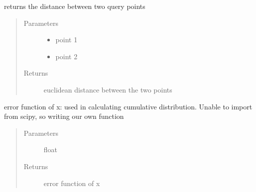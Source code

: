 \documentclass[letterpaper,12pt,english]{sphinxmanual}
\begin{document}
\begin{fulllineitems}
\label{\detokenize{PARyOpt:PARyOpt.utils.distance}}
\sphinxAtStartPar
returns the distance between two query points
\begin{quote}\begin{description}
\item[{Parameters}] \leavevmode\begin{itemize}
\item {} 
\sphinxAtStartPar
{} \textendash{} point 1

\item {} 
\sphinxAtStartPar
{} \textendash{} point 2

\end{itemize}

\item[{Returns}] \leavevmode
\sphinxAtStartPar
euclidean distance between the two points

\end{description}\end{quote}

\end{fulllineitems}


\begin{fulllineitems}
\label{\detokenize{PARyOpt:PARyOpt.utils.erf}}
\sphinxAtStartPar
error function of x: used in calculating cumulative distribution.
Unable to import from scipy, so writing our own function
\begin{quote}\begin{description}
\item[{Parameters}] \leavevmode
\sphinxAtStartPar
{} \textendash{} float

\item[{Returns}] \leavevmode
\sphinxAtStartPar
error function of x

\end{description}\end{quote}

\end{fulllineitems}
\end{document}
